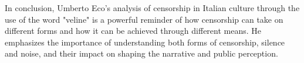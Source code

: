 \documentclass[12pt]{article}
\begin{document}
In conclusion, Umberto Eco's analysis of censorship in Italian
culture through the use of the word "veline" is a powerful reminder
of how censorship can take on different forms and how it can be
achieved through different means. He emphasizes the importance of
understanding both forms of censorship, silence and noise, and their
impact on shaping the narrative and public perception.
\end{document}
